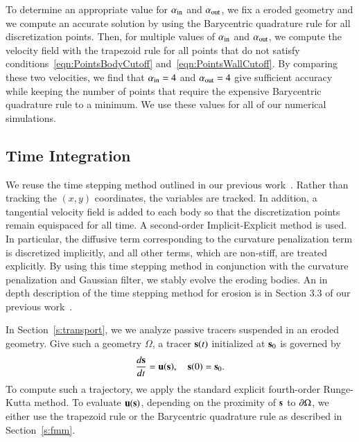 \documentclass[preprint, 10pt]{elsarticle}
\begin{document}
To determine an appropriate value for $\alpha_\iin$ and $\alpha_\out$,
we fix a eroded geometry and we compute an accurate solution by using
the Barycentric quadrature rule for all discretization points.  Then,
for multiple values of $\alpha_\iin$ and $\alpha_\out$, we compute the
velocity field with the trapezoid rule for all points that do not
satisfy conditions~\eqref{eqn:PointsBodyCutoff}
and~\eqref{eqn:PointsWallCutoff}.  By comparing these two velocities, we
find that $\alpha_\iin = 4$ and $\alpha_\out = 4$ give sufficient
accuracy while keeping the number of points that require the expensive
Barycentric quadrature rule to a minimum.  We use these values for all
of our numerical simulations.




\subsection{Time Integration}
\label{s:time}
We reuse the time stepping method outlined in our previous
work~\cite{qua-moo2018}.  Rather than tracking the $(x,y)$ coordinates,
the {\thL} variables are tracked. In addition, a tangential velocity
field is added to each body so that the discretization points remain
equispaced for all time.  A second-order Implicit-Explicit method is
used. In particular, the diffusive term corresponding to the curvature
penalization term is discretized implicitly, and all other terms, which
are non-stiff, are treated explicitly.  By using this time stepping
method in conjunction with the curvature penalization and Gaussian
filter, we stably evolve the eroding bodies.   An in depth description
of the time stepping method for erosion is in Section 3.3 of our
previous work~\cite{qua-moo2018}.

In Section~\ref{s:transport}, we we analyze passive tracers suspended in
an eroded geometry.  Give such a geometry $\Omega$, a tracer $\ss(t)$
initialized at $\ss_0$ is governed by 
\begin{align}
  \label{eqn:trajectories}
  \frac{d\ss}{dt} = \uu(\ss), \quad \ss(0) = \ss_0.
\end{align}
To compute such a trajectory, we apply the standard explicit
fourth-order Runge-Kutta method.  To evaluate $\uu(\ss)$, depending on
the proximity of $\ss$ to $\bd\Omega$, we either use the trapezoid rule
or the Barycentric quadrature rule as described in Section~\ref{s:fmm}.
\end{document}
